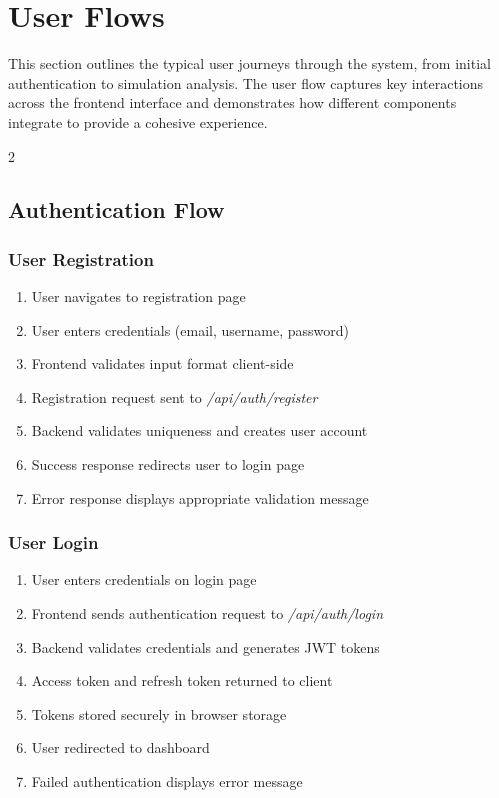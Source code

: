 \section{User Flows}

This section outlines the typical user journeys through the system, from initial authentication to simulation analysis. The user flow captures key interactions across the frontend interface and demonstrates how different components integrate to provide a cohesive experience.
\begin{multicols}{2}
\setlength{\columnsep}{5cm} %

\subsection{Authentication Flow}

\subsubsection*{User Registration}
\begin{enumerate}
    \item User navigates to registration page
    \item User enters credentials (email, username, password)
    \item Frontend validates input format client-side
    \item Registration request sent to \textit{/api/\allowbreak auth/\allowbreak register}
    \item Backend validates uniqueness and creates user account
    \item Success response redirects user to login page
    \item Error response displays appropriate validation message
\end{enumerate}

\subsubsection*{User Login}
\begin{enumerate}
    \item User enters credentials on login page
    \item Frontend sends authentication request to \textit{/api\allowbreak/auth\allowbreak/login}
    \item Backend validates credentials and generates JWT tokens
    \item Access token and refresh token returned to client
    \item Tokens stored securely in browser storage
    \item User redirected to dashboard
    \item Failed authentication displays error message
\end{enumerate}


\end{multicols}
